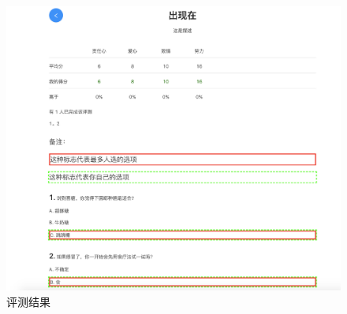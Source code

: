 \begin{figure}[thbp!]
	\centering
	\includegraphics[width=1.0\linewidth]{figure/result_main}
	\caption{评测结果}
	\label{fig:result_main}
\end{figure}